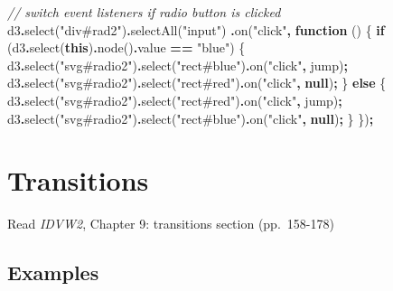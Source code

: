 \documentclass[
  openany]{book}
\newenvironment{Shaded}{\begin{snugshade}}{\end{snugshade}}
\newcommand{\AttributeTok}[1]{\textcolor[rgb]{0.77,0.63,0.00}{#1}}
\newcommand{\CommentTok}[1]{\textcolor[rgb]{0.56,0.35,0.01}{\textit{#1}}}
\newcommand{\ControlFlowTok}[1]{\textcolor[rgb]{0.13,0.29,0.53}{\textbf{#1}}}
\newcommand{\FunctionTok}[1]{\textcolor[rgb]{0.00,0.00,0.00}{#1}}
\newcommand{\KeywordTok}[1]{\textcolor[rgb]{0.13,0.29,0.53}{\textbf{#1}}}
\newcommand{\NormalTok}[1]{#1}
\newcommand{\OperatorTok}[1]{\textcolor[rgb]{0.81,0.36,0.00}{\textbf{#1}}}
\newcommand{\StringTok}[1]{\textcolor[rgb]{0.31,0.60,0.02}{#1}}
\begin{document}
\begin{Shaded}
\begin{Highlighting}[]
\CommentTok{// switch event listeners if radio button is clicked}
\NormalTok{d3}\OperatorTok{.}\FunctionTok{select}\NormalTok{(}\StringTok{"div\#rad2"}\NormalTok{)}\OperatorTok{.}\FunctionTok{selectAll}\NormalTok{(}\StringTok{"input"}\NormalTok{)}
  \OperatorTok{.}\FunctionTok{on}\NormalTok{(}\StringTok{"click"}\OperatorTok{,} \KeywordTok{function}\NormalTok{ () \{}
  \ControlFlowTok{if}\NormalTok{ (d3}\OperatorTok{.}\FunctionTok{select}\NormalTok{(}\KeywordTok{this}\NormalTok{)}\OperatorTok{.}\FunctionTok{node}\NormalTok{()}\OperatorTok{.}\AttributeTok{value} \OperatorTok{==} \StringTok{"blue"}\NormalTok{) \{}
\NormalTok{    d3}\OperatorTok{.}\FunctionTok{select}\NormalTok{(}\StringTok{"svg\#radio2"}\NormalTok{)}\OperatorTok{.}\FunctionTok{select}\NormalTok{(}\StringTok{"rect\#blue"}\NormalTok{)}\OperatorTok{.}\FunctionTok{on}\NormalTok{(}\StringTok{"click"}\OperatorTok{,}\NormalTok{ jump)}\OperatorTok{;}
\NormalTok{    d3}\OperatorTok{.}\FunctionTok{select}\NormalTok{(}\StringTok{"svg\#radio2"}\NormalTok{)}\OperatorTok{.}\FunctionTok{select}\NormalTok{(}\StringTok{"rect\#red"}\NormalTok{)}\OperatorTok{.}\FunctionTok{on}\NormalTok{(}\StringTok{"click"}\OperatorTok{,} \KeywordTok{null}\NormalTok{)}\OperatorTok{;}
\NormalTok{    \} }\ControlFlowTok{else}\NormalTok{ \{}
\NormalTok{    d3}\OperatorTok{.}\FunctionTok{select}\NormalTok{(}\StringTok{"svg\#radio2"}\NormalTok{)}\OperatorTok{.}\FunctionTok{select}\NormalTok{(}\StringTok{"rect\#red"}\NormalTok{)}\OperatorTok{.}\FunctionTok{on}\NormalTok{(}\StringTok{"click"}\OperatorTok{,}\NormalTok{ jump)}\OperatorTok{;}
\NormalTok{    d3}\OperatorTok{.}\FunctionTok{select}\NormalTok{(}\StringTok{"svg\#radio2"}\NormalTok{)}\OperatorTok{.}\FunctionTok{select}\NormalTok{(}\StringTok{"rect\#blue"}\NormalTok{)}\OperatorTok{.}\FunctionTok{on}\NormalTok{(}\StringTok{"click"}\OperatorTok{,} \KeywordTok{null}\NormalTok{)}\OperatorTok{;}
\NormalTok{    \}}
\NormalTok{\})}\OperatorTok{;}
\end{Highlighting}
\end{Shaded}

\hypertarget{transitions}{%
\chapter{\texorpdfstring{Transitions }{Transitions }}\label{transitions}}

Read \emph{IDVW2}, Chapter 9: transitions section (pp.~158-178)

\hypertarget{examples-1}{%
\section{Examples}\label{examples-1}}
\end{document}
